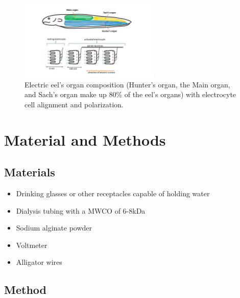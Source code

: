 \documentclass[letterpaper]{article}
\begin{document}
\begin{figure}[H]
	\centering
	\includegraphics[width=0.60\textwidth]{fig1.jpg}
	\caption{Electric eel's organ composition (Hunter's organ, the Main organ, and Sach's organ make up 80\% of the eel's organs) with electrocyte cell alignment and polarization.}
	\label{fig:1}
\end{figure}

\section{Material and Methods}
\label{sec:matandmet}

\subsection*{Materials}

\begin{itemize}
	\item Drinking glasses or other receptacles capable of holding water
	\item Dialysis tubing with a MWCO of 6-8kDa
	\item Sodium alginate powder
	\item Voltmeter
	\item Alligator wires
\end{itemize}

\subsection*{Method}
\end{document}

